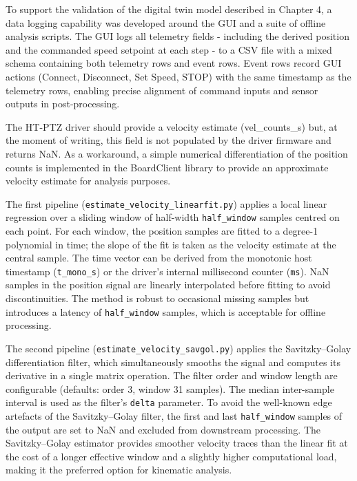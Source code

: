 To support the validation of the digital twin model described in Chapter 4, a data logging capability was developed around the GUI and a suite of offline analysis scripts. The GUI logs all telemetry fields - including the derived position and the commanded speed setpoint at each step - to a CSV file with a mixed schema containing both telemetry rows and event rows. Event rows record GUI actions (Connect, Disconnect, Set Speed, STOP) with the same timestamp as the telemetry rows, enabling precise alignment of command inputs and sensor outputs in post-processing.

The HT-PTZ driver should provide a velocity estimate (vel\_counts\_s) but, at the moment of writing, this field is not populated by the driver firmware and returns NaN. As a workaround, a simple numerical differentiation of the position counts is implemented in the BoardClient library to provide an approximate velocity estimate for analysis purposes. 

The first pipeline (\texttt{estimate\_velocity\_linearfit.py}) applies a local linear regression over a sliding window of half-width \texttt{half\_window} samples centred on each point. For each window, the position samples are fitted to a degree-1 polynomial in time; the slope of the fit is taken as the velocity estimate at the central sample. The time vector can be derived from the monotonic host timestamp (\texttt{t\_mono\_s}) or the driver's internal millisecond counter (\texttt{ms}). NaN samples in the position signal are linearly interpolated before fitting to avoid discontinuities. The method is robust to occasional missing samples but introduces a latency of \texttt{half\_window} samples, which is acceptable for offline processing.

The second pipeline (\texttt{estimate\_velocity\_savgol.py}) applies the Savitzky--Golay differentiation filter, which simultaneously smooths the signal and computes its derivative in a single matrix operation. The filter order and window length are configurable (defaults: order 3, window 31 samples). The median inter-sample interval is used as the filter's \texttt{delta} parameter. To avoid the well-known edge artefacts of the Savitzky--Golay filter, the first and last \texttt{half\_window} samples of the output are set to NaN and excluded from downstream processing. The Savitzky--Golay estimator provides smoother velocity traces than the linear fit at the cost of a longer effective window and a slightly higher computational load, making it the preferred option for kinematic analysis.

